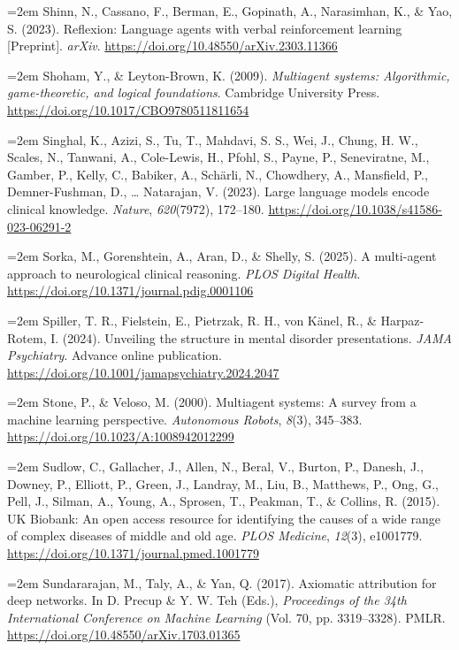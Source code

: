 \documentclass[11pt,a4paper,twoside]{article}
\begin{document}
\hangindent=2em Shinn, N., Cassano, F., Berman, E., Gopinath, A., Narasimhan, K., \& Yao, S. (2023). Reflexion: Language agents with verbal reinforcement learning [Preprint]. \textit{arXiv}. \url{https://doi.org/10.48550/arXiv.2303.11366}

\hangindent=2em Shoham, Y., \& Leyton-Brown, K. (2009). \textit{Multiagent systems: Algorithmic, game-theoretic, and logical foundations}. Cambridge University Press. \url{https://doi.org/10.1017/CBO9780511811654}

\hangindent=2em Singhal, K., Azizi, S., Tu, T., Mahdavi, S. S., Wei, J., Chung, H. W., Scales, N., Tanwani, A., Cole-Lewis, H., Pfohl, S., Payne, P., Seneviratne, M., Gamber, P., Kelly, C., Babiker, A., Schärli, N., Chowdhery, A., Mansfield, P., Demner-Fushman, D., \ldots{} Natarajan, V. (2023). Large language models encode clinical knowledge. \textit{Nature}, \textit{620}(7972), 172--180. \url{https://doi.org/10.1038/s41586-023-06291-2}

\hangindent=2em Sorka, M., Gorenshtein, A., Aran, D., \& Shelly, S. (2025). A multi-agent approach to neurological clinical reasoning. \textit{PLOS Digital Health}. \url{https://doi.org/10.1371/journal.pdig.0001106}

\hangindent=2em Spiller, T. R., Fielstein, E., Pietrzak, R. H., von Känel, R., \& Harpaz-Rotem, I. (2024). Unveiling the structure in mental disorder presentations. \textit{JAMA Psychiatry}. Advance online publication. \url{https://doi.org/10.1001/jamapsychiatry.2024.2047}

\hangindent=2em Stone, P., \& Veloso, M. (2000). Multiagent systems: A survey from a machine learning perspective. \textit{Autonomous Robots}, \textit{8}(3), 345--383. \url{https://doi.org/10.1023/A:1008942012299}

\hangindent=2em Sudlow, C., Gallacher, J., Allen, N., Beral, V., Burton, P., Danesh, J., Downey, P., Elliott, P., Green, J., Landray, M., Liu, B., Matthews, P., Ong, G., Pell, J., Silman, A., Young, A., Sprosen, T., Peakman, T., \& Collins, R. (2015). UK Biobank: An open access resource for identifying the causes of a wide range of complex diseases of middle and old age. \textit{PLOS Medicine}, \textit{12}(3), e1001779. \url{https://doi.org/10.1371/journal.pmed.1001779}

\hangindent=2em Sundararajan, M., Taly, A., \& Yan, Q. (2017). Axiomatic attribution for deep networks. In D. Precup \& Y. W. Teh (Eds.), \textit{Proceedings of the 34th International Conference on Machine Learning} (Vol. 70, pp. 3319--3328). PMLR. \url{https://doi.org/10.48550/arXiv.1703.01365}
\end{document}
